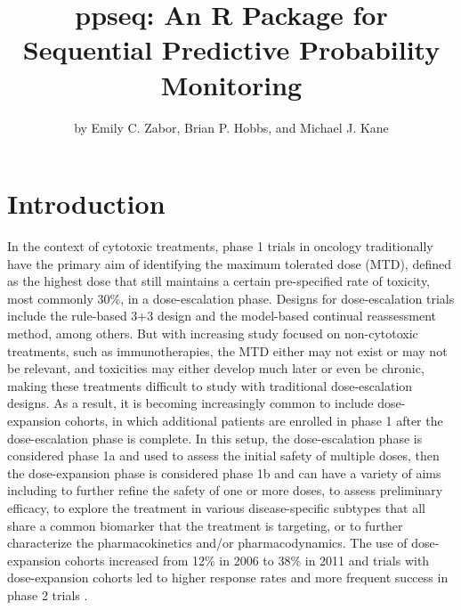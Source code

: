 \title{ppseq: An R Package for Sequential Predictive Probability
Monitoring}
\author{by Emily C. Zabor, Brian P. Hobbs, and Michael J. Kane}

\maketitle


\hypertarget{introduction}{%
\section{Introduction}\label{introduction}}

In the context of cytotoxic treatments, phase 1 trials in oncology
traditionally have the primary aim of identifying the maximum tolerated
dose (MTD), defined as the highest dose that still maintains a certain
pre-specified rate of toxicity, most commonly 30\%, in a dose-escalation
phase. Designs for dose-escalation trials include the rule-based 3+3
design and the model-based continual reassessment method, among others.
But with increasing study focused on non-cytotoxic treatments, such as
immunotherapies, the MTD either may not exist or may not be relevant,
and toxicities may either develop much later or even be chronic, making
these treatments difficult to study with traditional dose-escalation
designs. As a result, it is becoming increasingly common to include
dose-expansion cohorts, in which additional patients are enrolled in
phase 1 after the dose-escalation phase is complete. In this setup, the
dose-escalation phase is considered phase 1a and used to assess the
initial safety of multiple doses, then the dose-expansion phase is
considered phase 1b and can have a variety of aims including to further
refine the safety of one or more doses, to assess preliminary efficacy,
to explore the treatment in various disease-specific subtypes that all
share a common biomarker that the treatment is targeting, or to further
characterize the pharmacokinetics and/or pharmacodynamics. The use of
dose-expansion cohorts increased from 12\% in 2006 to 38\% in 2011
\citep{Manji2013} and trials with dose-expansion cohorts led to higher
response rates and more frequent success in phase 2 trials
\citep{Bugano2017}.

